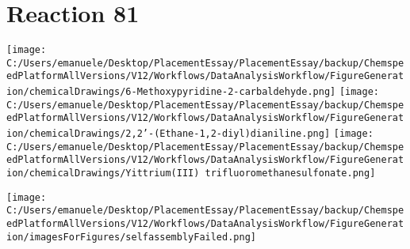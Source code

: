 \documentclass{article}%
\begin{document}
\section*{Reaction 81}%
%
\begin{scheme}[H]%
\begin{minipage}{0.5\textwidth}%
\texttt{[image: C:/Users/emanuele/Desktop/PlacementEssay/PlacementEssay/backup/ChemspeedPlatformAllVersions/V12/Workflows/DataAnalysisWorkflow/FigureGeneration/chemicalDrawings/6-Methoxypyridine-2-carbaldehyde.png]}%
\texttt{[image: C:/Users/emanuele/Desktop/PlacementEssay/PlacementEssay/backup/ChemspeedPlatformAllVersions/V12/Workflows/DataAnalysisWorkflow/FigureGeneration/chemicalDrawings/2,2'-(Ethane-1,2-diyl)dianiline.png]}%
\texttt{[image: C:/Users/emanuele/Desktop/PlacementEssay/PlacementEssay/backup/ChemspeedPlatformAllVersions/V12/Workflows/DataAnalysisWorkflow/FigureGeneration/chemicalDrawings/Yittrium(III) trifluoromethanesulfonate.png]}%
\end{minipage}%
\begin{minipage}{0.5\textwidth}%
\begin{center}%
\texttt{[image: C:/Users/emanuele/Desktop/PlacementEssay/PlacementEssay/backup/ChemspeedPlatformAllVersions/V12/Workflows/DataAnalysisWorkflow/FigureGeneration/imagesForFigures/selfassemblyFailed.png]}%
\end{center}%
\end{minipage}%
\caption{Self-assembly of components 6, 20, with Yittrium(III) in a 3.0:1.5:1.0 molar ratio in CH$_3$CN at 60\textdegree C for 40h. These are the reagents (starting materials) for reaction 81.}%
\end{scheme}%
\end{document}
